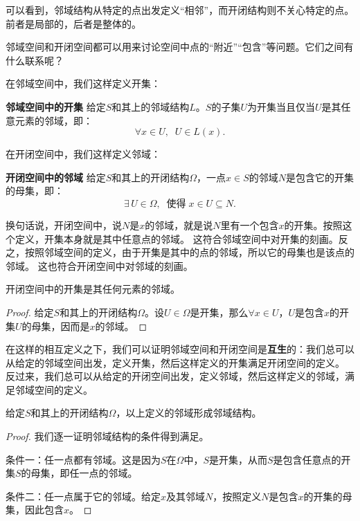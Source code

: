 \documentclass[12pt,UTF8]{ctexbook}
\begin{document}
\begin{appendix}
可以看到，邻域结构从特定的点出发定义“相邻”，而开闭结构则不关心特定的点。前者是局部的，后者是整体的。

邻域空间和开闭空间都可以用来讨论空间中点的“附近”“包含”等问题。它们之间有什么联系呢？

在邻域空间中，我们这样定义开集：
\begin{df}{\textbf{邻域空间中的开集}}\label{df:a-0-2}
    给定$S$和其上的邻域结构$L$。$S$的子集$U$为开集当且仅当$U$是其任意元素的邻域，即：
    $$ \forall x\in U, \;\; U\in L(x).$$
\end{df}

在开闭空间中，我们这样定义邻域：
\begin{df}{\textbf{开闭空间中的邻域}}\label{df:a-0-3}
    给定$S$和其上的开闭结构$\Omega$，一点$x\in S$的邻域$N$是包含它的开集的母集，即：
    $$ \exists\, U \in \Omega, \;\; \mbox{使得}\; x\in U \subseteq N.  $$
\end{df}
换句话说，开闭空间中，说$N$是$x$的邻域，就是说$N$里有一个包含$x$的开集。按照这个定义，开集本身就是其中任意点的邻域。
这符合邻域空间中对开集的刻画。反之，按照邻域空间的定义，由于开集是其中的点的邻域，所以它的母集也是该点的邻域。
这也符合开闭空间中对邻域的刻画。

\begin{tm}\label{tm:a-0-0}
    开闭空间中的开集是其任何元素的邻域。
\end{tm}

\begin{proof}
    给定$S$和其上的开闭结构$\Omega$。设$U\in \Omega$是开集，那么$\forall x\in U$，$U$是包含$x$的开集$U$的母集，因而是$x$的邻域。
\end{proof}

在这样的相互定义之下，我们可以证明邻域空间和开闭空间是\textbf{互生}的：我们总可以从给定的邻域空间出发，定义开集，然后这样定义的开集满足开闭空间的定义。
反过来，我们总可以从给定的开闭空间出发，定义邻域，然后这样定义的邻域，满足邻域空间的定义。

\begin{tm}
    给定$S$和其上的开闭结构$\Omega$，以上定义的邻域形成邻域结构。
\end{tm}

\begin{proof}
    我们逐一证明邻域结构的条件得到满足。

    条件一：任一点都有邻域。这是因为$S$在$\Omega$中，$S$是开集，从而$S$是包含任意点的开集$S$的母集，即任一点的邻域。

    条件二：任一点属于它的邻域。给定$x$及其邻域$N$，按照定义$N$是包含$x$的开集的母集，因此包含$x$。


\end{proof}
\end{appendix}
\end{document}
